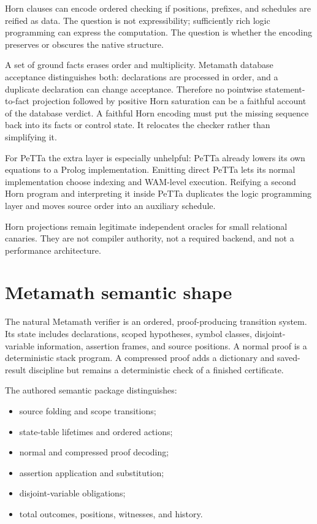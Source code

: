 \documentclass[11pt]{article}
\theoremstyle{remark}
\begin{document}
Horn clauses can encode ordered checking if positions, prefixes, and schedules
are reified as data.  The question is not expressibility; sufficiently rich
logic programming can express the computation.  The question is whether the
encoding preserves or obscures the native structure.

A set of ground facts erases order and multiplicity.  Metamath database
acceptance distinguishes both: declarations are processed in order, and a
duplicate declaration can change acceptance.  Therefore no pointwise
statement-to-fact projection followed by positive Horn saturation can be a
faithful account of the database verdict.  A faithful Horn encoding must put
the missing sequence back into its facts or control state.  It relocates the
checker rather than simplifying it.

For PeTTa the extra layer is especially unhelpful: PeTTa already lowers its
own equations to a Prolog implementation.  Emitting direct PeTTa lets its
normal implementation choose indexing and WAM-level execution.  Reifying a
second Horn program and interpreting it inside PeTTa duplicates the logic
programming layer and moves source order into an auxiliary schedule.

Horn projections remain legitimate independent oracles for small relational
canaries.  They are not compiler authority, not a required backend, and not a
performance architecture.

\section{Metamath semantic shape}

The natural Metamath verifier is an ordered, proof-producing transition
system.  Its state includes declarations, scoped hypotheses, symbol classes,
disjoint-variable information, assertion frames, and source positions.  A
normal proof is a deterministic stack program.  A compressed proof adds a
dictionary and saved-result discipline but remains a deterministic check of a
finished certificate.

The authored semantic package distinguishes:
\begin{itemize}
\item source folding and scope transitions;
\item state-table lifetimes and ordered actions;
\item normal and compressed proof decoding;
\item assertion application and substitution;
\item disjoint-variable obligations;
\item total outcomes, positions, witnesses, and history.
\end{itemize}
\end{document}

